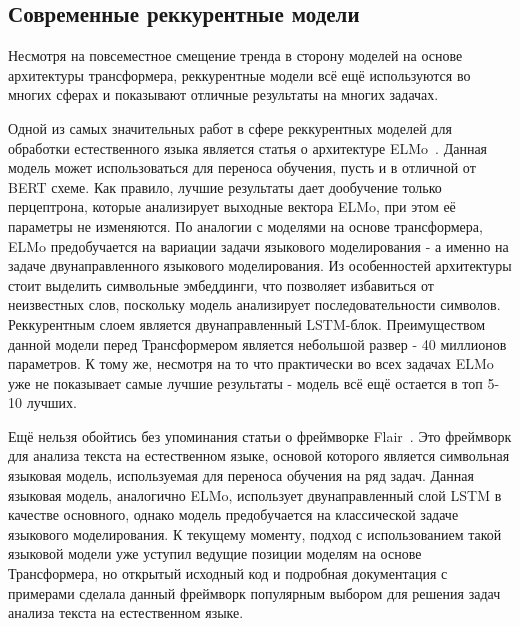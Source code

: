 \subsection{Современные реккурентные модели}
Несмотря на повсеместное смещение тренда в сторону моделей на основе архитектуры трансформера, реккурентные модели всё ещё используются во многих сферах и показывают отличные результаты на многих задачах.
\par Одной из самых значительных работ в сфере реккурентных моделей для обработки естественного языка является статья о архитектуре ELMo~\cite{elmo}. Данная модель может использоваться для переноса обучения, пусть и в отличной от BERT схеме. Как правило, лучшие результаты дает дообучение только перцептрона, которые анализирует выходные вектора ELMo, при этом её параметры не изменяются. По аналогии с моделями на основе трансформера, ELMo предобучается на вариации задачи языкового моделирования - а именно на задаче двунаправленного языкового моделирования. Из особенностей архитектуры стоит выделить символьные эмбеддинги, что позволяет избавиться от неизвестных слов, поскольку модель анализирует последовательности символов. Реккурентным слоем является двунаправленный LSTM-блок. Преимуществом данной модели перед Трансформером является небольшой развер - 40 миллионов параметров. К тому же, несмотря на то что практически во всех задачах ELMo уже не показывает самые лучшие результаты - модель всё ещё остается в топ 5-10 лучших.

\par Ещё нельзя обойтись без упоминания статьи о фреймворке Flair~\cite{flair}. Это фреймворк для анализа текста на естественном языке, основой которого является символьная языковая модель, используемая для переноса обучения на ряд задач. Данная языковая модель, аналогично ELMo, использует двунаправленный слой LSTM в качестве основного, однако модель предобучается на классической задаче языкового моделирования. К текущему моменту, подход с использованием такой языковой модели уже уступил ведущие позиции моделям на основе Трансформера, но открытый исходный код и подробная документация с примерами сделала данный фреймворк популярным выбором для решения задач анализа текста на естественном языке.

\clearpage
